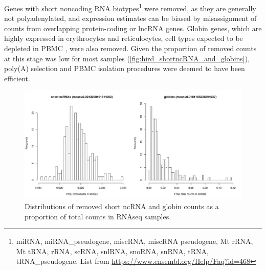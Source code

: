 Genes with short noncoding RNA biotypes\footnote{miRNA, miRNA\_pseudogene, miscRNA, miscRNA pseudogene, Mt rRNA, Mt tRNA, rRNA, scRNA, snlRNA, snoRNA, snRNA, tRNA, tRNA\_pseudogene. List from \url{https://www.ensembl.org/Help/Faq?id=468}} were removed, as they are generally not polyadenylated, and expression estimates can be biased by misassignment of counts from overlapping protein-coding or lncRNA genes\autocite{zhao2018EvaluationTwoMain}.
Globin genes, which are highly expressed in erythrocytes and reticulocytes, cell types expected to be depleted in \gls{PBMC} \autocite{min2010VariabilityGeneExpression}, were also removed.
Given the proportion of removed counts at this stage was low for most samples (\autoref{fig:hird_shortncRNA_and_globins}), poly(A) selection and \gls{PBMC} isolation procedures were deemed to have been efficient.

\begin{figure}
    \centering
    \includegraphics[width=1.0\textwidth, page=1]{mainmatter/figures/chapter_02/rnaseq_data_setup.per_sample.short_ncRNA_globin_levels_hist.pdf}
    \caption{Distributions of removed short ncRNA and globin counts as a proportion of total counts in \gls{RNAseq} samples.}
    \label{fig:hird_shortncRNA_and_globins}
\end{figure}

